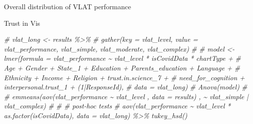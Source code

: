 \documentclass[
]{article}
\newenvironment{Shaded}{\begin{snugshade}}{\end{snugshade}}
\newcommand{\CommentTok}[1]{\textcolor[rgb]{0.56,0.35,0.01}{\textit{#1}}}
\begin{document}
Overall distribution of VLAT performance

Trust in Vis

\begin{Shaded}
\begin{Highlighting}[]
\CommentTok{\# vlat\_long \textless{}{-} results \%\textgreater{}\%}
\CommentTok{\#   gather(key = vlat\_level, value = vlat\_performance, vlat\_simple,  vlat\_moderate, vlat\_complex) }
\CommentTok{\# }
\CommentTok{\# model \textless{}{-} lmer(formula = vlat\_performance \textasciitilde{} vlat\_level * isCovidData * chartType +}
\CommentTok{\#               Age + Gender + State\_1 + Education + Parents\_education + Language + }
\CommentTok{\#               Ethnicity + Income + Religion + trust.in.science\_7 + }
\CommentTok{\#               need\_for\_cognition + interpersonal.trust\_1 + (1|ResponseId),}
\CommentTok{\#             data = vlat\_long)}
\CommentTok{\# Anova(model)}
\CommentTok{\# }
\CommentTok{\# emmeans(aov(vlat\_performance \textasciitilde{} vlat\_level , data = results) , \textasciitilde{} vlat\_simple | vlat\_complex)}
\CommentTok{\# }
\CommentTok{\# \# post{-}hoc tests}
\CommentTok{\# aov(vlat\_performance \textasciitilde{} vlat\_level * as.factor(isCovidData), data = vlat\_long) \%\textgreater{}\% tukey\_hsd()}
\end{Highlighting}
\end{Shaded}
\end{document}
